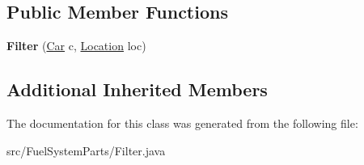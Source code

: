 \subsection*{Public Member Functions}
\begin{DoxyCompactItemize}
\item 
\hypertarget{classFuelSystemParts_1_1Filter_a6424e9860b6d9740c1fd6c12f0f9bf21}{}{\bfseries Filter} (\hyperlink{classCars_1_1Car}{Car} c, \hyperlink{enumEnums_1_1Location}{Location} loc)\label{classFuelSystemParts_1_1Filter_a6424e9860b6d9740c1fd6c12f0f9bf21}

\end{DoxyCompactItemize}
\subsection*{Additional Inherited Members}


The documentation for this class was generated from the following file\+:\begin{DoxyCompactItemize}
\item 
src/\+Fuel\+System\+Parts/Filter.\+java\end{DoxyCompactItemize}
